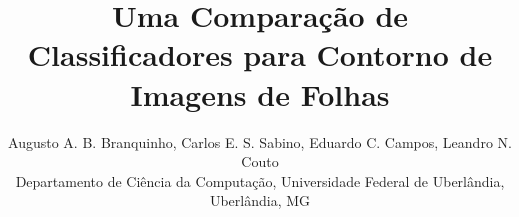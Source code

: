 \documentclass[conference]{IEEEtran}
\begin{document}
%
\title{Uma Comparação de Classificadores para Contorno de Imagens de Folhas}



\author{Augusto A. B. Branquinho, Carlos E. S. Sabino, Eduardo C. Campos, Leandro N. Couto\\
Departamento de Ciência da Computação, Universidade Federal de Uberlândia, Uberlândia, MG}

% 








\maketitle
\end{document}
